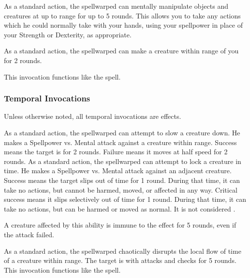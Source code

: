             As a standard action, the spellwarped can mentally manipulate objects and creatures at up to \rngclose range for up to 5 rounds.
            This allows you to take any actions which he could normally take with your hands, using your spellpower in place of your Strength or Dexterity, as appropriate.

            As a standard action, the spellwarped can make a creature within \rngmed range of you \immobilized for 2 rounds.

            This invocation functions like the  spell.

        \subsubsection{Temporal Invocations}
            Unless otherwise noted, all temporal invocations are  effects.

            As a standard action, the spellwarped can attempt to slow a creature down.
            He makes a Spellpower vs. Mental attack against a creature within \rngmed range.
            Success means the target is \immobilized for 2 rounds.
            Failure means it moves at half speed for 2 rounds.
            As a standard action, the spellwarped can attempt to lock a creature in time.
            He makes a Spellpower vs. Mental attack against an adjacent creature.
            Success means the target slips out of time for 1 round.
            During that time, it can take no actions, but cannot be harmed, moved, or affected in any way.
            Critical success means it slips selectively out of time for 1 round.
            During that time, it can take no actions, but can be harmed or moved as normal.
            It is not considered \helpless.
            \par A creature affected by this ability is immune to the effect for 5 rounds, even if the attack failed.

            As a standard action, the spellwarped chaotically disrupts the local flow of time of a creature within \rngclose range.
            The target is \impaired with attacks and checks for 5 rounds.
            This invocation functions like the  spell.

